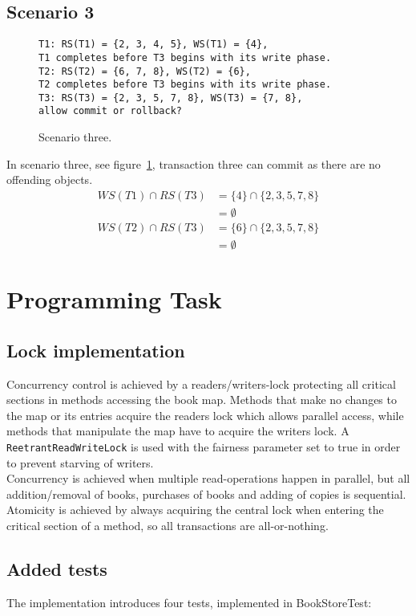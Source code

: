 \documentclass[12pt]{article}
\begin{document}
\subsection*{Scenario 3}
\begin{figure}[h!]
\texttt{T1: RS(T1) = \{2, 3, 4, 5\}, WS(T1) = \{4\},\\
T1 completes before T3 begins with its write phase.\\
T2: RS(T2) = \{6, 7, 8\}, WS(T2) = \{6\},\\
T2 completes before T3 begins with its write phase.\\
T3: RS(T3) = \{2, 3, 5, 7, 8\}, WS(T3) = \{7, 8\},\\
allow commit or rollback?}
\caption{Scenario three.}
\label{sc3}
\end{figure}
In scenario three, see figure~\ref{sc3}, transaction three can commit as there are no offending objects.
\begin{align}
WS(T1) \cap RS(T3) &= \{4\} \cap \{2, 3, 5, 7, 8\}\\
&= \emptyset\\
WS(T2) \cap RS(T3) &= \{6\} \cap \{2, 3, 5, 7, 8\}\\
&= \emptyset
\end{align}
\section*{Programming Task}
\subsection*{Lock implementation}
Concurrency control is achieved by a readers/writers-lock protecting all critical sections in methods accessing the book map. Methods that make no changes to the map or its entries acquire the readers lock which allows parallel access, while methods that manipulate the map have to acquire the writers lock. A \verb|ReetrantReadWriteLock| is used with the fairness parameter set to true in order to prevent starving of writers. \\
Concurrency is achieved when multiple read-operations happen in parallel, but all addition/removal of books, purchases of books and adding of copies is sequential. \\
Atomicity is achieved by always acquiring the central lock when entering the critical section of a method, so all transactions are all-or-nothing.
\subsection*{Added tests}
The implementation introduces four tests, implemented in BookStoreTest:
\end{document}
